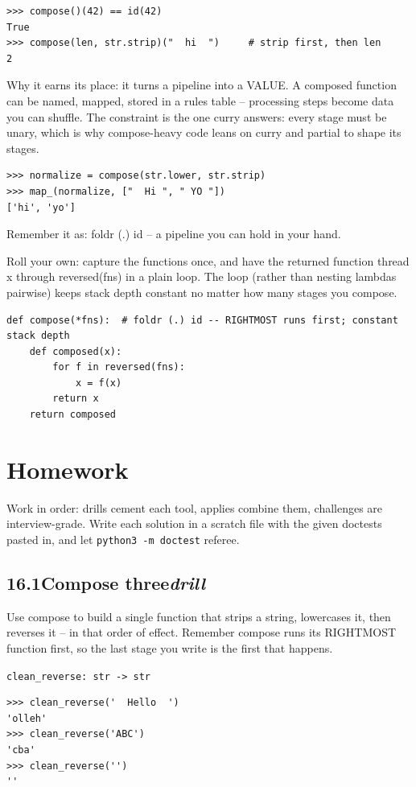 \documentclass[10pt,letterpaper]{book}
\begin{document}
\begin{lstlisting}[style=ex]
>>> compose()(42) == id(42)
True
>>> compose(len, str.strip)("  hi  ")     # strip first, then len
2
\end{lstlisting}

Why it earns its place: it turns a pipeline into a VALUE. A composed function can be named, mapped, stored in a rules table -- processing steps become data you can shuffle. The constraint is the one curry answers: every stage must be unary, which is why compose-heavy code leans on curry and partial to shape its stages.

\begin{lstlisting}[style=ex]
>>> normalize = compose(str.lower, str.strip)
>>> map_(normalize, ["  Hi ", " YO "])
['hi', 'yo']
\end{lstlisting}

Remember it as: foldr (.) id -- a pipeline you can hold in your hand.


Roll your own: capture the functions once, and have the returned function thread x through reversed(fns) in a plain loop. The loop (rather than nesting lambdas pairwise) keeps stack depth constant no matter how many stages you compose.

\begin{lstlisting}[style=ex]
def compose(*fns):  # foldr (.) id -- RIGHTMOST runs first; constant stack depth
    def composed(x):
        for f in reversed(fns):
            x = f(x)
        return x
    return composed
\end{lstlisting}
\section{Homework}
Work in order: drills cement each tool, applies combine them,
challenges are interview-grade. Write each solution in a scratch file with
the given doctests pasted in, and let \texttt{python3 -m doctest} referee.
\subsection*{16.1\quad Compose three\hfill\textnormal{\textit{drill}}}
Use compose to build a single function that strips a string, lowercases it, then reverses it -- in that order of effect. Remember compose runs its RIGHTMOST function first, so the last stage you write is the first that happens.

\noindent\texttt{clean\_reverse: str -> str}
\begin{lstlisting}[style=ex]
>>> clean_reverse('  Hello  ')
'olleh'
>>> clean_reverse('ABC')
'cba'
>>> clean_reverse('')
''
\end{lstlisting}
\end{document}
